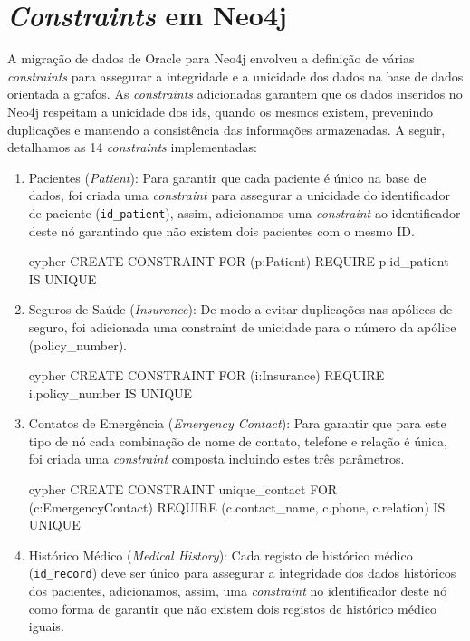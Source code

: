\section{\textit{Constraints} em Neo4j}

A migração de dados de Oracle para Neo4j envolveu a definição de várias \textit{constraints} para assegurar a integridade e a unicidade dos dados na base de dados orientada a grafos. As \textit{constraints} adicionadas garantem que os dados inseridos no Neo4j respeitam a unicidade dos ids, quando os mesmos existem, prevenindo duplicações e mantendo a consistência das informações armazenadas. A seguir, detalhamos as 14 \textit{constraints} implementadas:
\begin{enumerate}
    \item Pacientes (\textit{Patient}): Para garantir que cada paciente é único na base de dados, foi criada uma \textit{constraint} para assegurar a unicidade do identificador de paciente (\texttt{id\_patient}), assim, adicionamos uma \textit{constraint} ao identificador deste nó garantindo que não existem dois pacientes com o mesmo ID. 

    \begin{myminted}{cypher}
    CREATE CONSTRAINT FOR (p:Patient) REQUIRE p.id_patient IS UNIQUE
    \end{myminted}

    \item Seguros de Saúde (\textit{Insurance}): De modo a evitar duplicações nas apólices de seguro, foi adicionada uma constraint de unicidade para o número da apólice (policy\_number). 

    \begin{myminted}{cypher}
    CREATE CONSTRAINT FOR (i:Insurance) REQUIRE i.policy_number IS UNIQUE
    \end{myminted}
    
    \item Contatos de Emergência (\textit{Emergency Contact}): Para garantir que para este tipo de nó cada combinação de nome de contato, telefone e relação é única, foi criada uma \textit{constraint} composta incluindo estes três parâmetros.
    
    \begin{myminted}{cypher}
    CREATE CONSTRAINT unique_contact FOR (c:EmergencyContact) REQUIRE (c.contact_name, c.phone, c.relation) IS UNIQUE
    \end{myminted}
    
    \item Histórico Médico (\textit{Medical History}): Cada registo de histórico médico (\texttt{id\_record}) deve ser único para assegurar a integridade dos dados históricos dos pacientes, adicionamos, assim, uma \textit{constraint} no identificador deste nó como forma de garantir que não existem dois registos de histórico médico iguais.


\end{enumerate}
